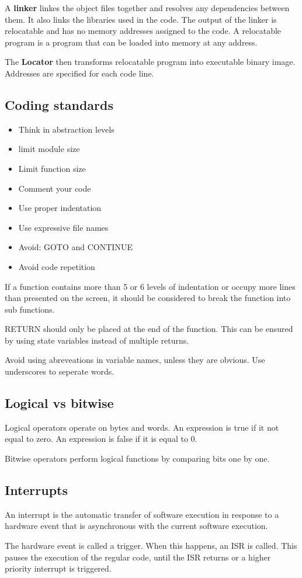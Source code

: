 A \textbf{linker} linkes the object files together and resolves
any dependencies between them. It also links the libraries used
in the code. The output of the linker is relocatable and has no memory
addresses assigned to the code.
A relocatable program is a program that can be loaded into memory
at any address.

The \textbf{Locator} then transforms relocatable program into executable
binary image. Addresses are specified for each code line.


\subsection{Coding standards}
\begin{itemize}
	\item Think in abstraction levels
	\item limit module size
	\item Limit function size
	\item Comment your code
	\item Use proper indentation
	\item Use expressive file names
	\item Avoid: GOTO and CONTINUE
	\item Avoid code repetition
\end{itemize}

If a function contains more than 5 or 6 levels of indentation
or occupy more lines than presented on the screen, it should
be considered to break the function into sub functions.


RETURN should only be placed at the end of the function.
This can be ensured by using state variables instead of multiple
returns.

Avoid using abreveations in variable names, unless they are obvious.
Use underscores to seperate words.


\subsection{Logical vs bitwise}

Logical operators operate on bytes and words.
An expression is true if it not equal to zero. An expression is false
if it is equal to 0.

Bitwise operators perform logical functions by comparing bits one by one.



\subsection{Interrupts}
An interrupt is the automatic transfer of software execution in response to a hardware event that is asynchronous with the current software execution.

The hardware event is called a trigger. When this happens, an ISR is called.
This pauses the execution of the regular code, until the ISR returns or a
higher priority interrupt is triggered.

